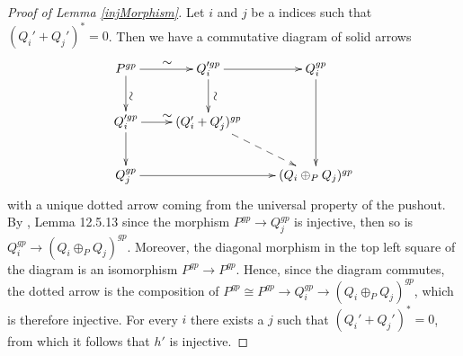\documentclass[12pt]{amsart}
\numberwithin{equation}{section}
\theoremstyle{plain}
\theoremstyle{remark}
\begin{document}
\begin{proof}[Proof of Lemma \eqref{injMorphism}]
	Let $i$ and $j$ be a indices such that $(Q_i' + Q_j')^* = 0$. Then we have a commutative diagram of solid arrows
$$\xymatrix{
	P^{gp} \ar^{\rotatebox{0}{$\sim$}}[r]\ar^{\rotatebox{90}{$\sim$}}[d] & Q_i'^{gp}\ar^{\rotatebox{270}{$\sim$}}[d]\ar[r] & Q_i^{gp}\ar[dd]\\
	Q_i'^{gp} \ar^{\rotatebox{0}{$\sim$}}[r]\ar[d] & (Q_i' + Q_j')^{gp}\ar@{-->}[dr] & \\
	Q_j^{gp}\ar[rr] & & (Q_i\oplus_P Q_j)^{gp}
	}$$
with a unique dotted arrow coming from the universal property of the pushout. By \cite{StacksProj}, Lemma 12.5.13 since the morphism $P^{gp}\to Q_j^{gp}$ is injective, then so is $Q_i^{gp}\to (Q_i\oplus_P Q_j)^{gp}$. Moreover, the diagonal morphism in the top left square of the diagram is an isomorphism $P^{gp}\to P^{gp}$. Hence, since the diagram commutes, the dotted arrow is the composition of $P^{gp}\cong P^{gp} \to Q_i^{gp} \to (Q_i\oplus_P Q_j)^{gp}$, which is therefore injective. For every $i$ there exists a $j$ such that $(Q_i' + Q_j')^* = 0$, from which it follows that $h'$ is injective.
\end{proof}
\end{document}

